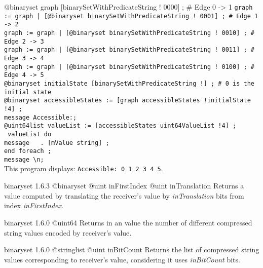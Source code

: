 \exempleUneLigne
{}
{@binaryset graph [binarySetWithPredicateString ! 0000\textquotedbl] ; \# Edge 0 -> 1}
\texttt{graph := graph | [@binaryset binarySetWithPredicateString ! 0001\textquotedbl] ; \# Edge 1 -> 2}\\
\texttt{graph := graph | [@binaryset binarySetWithPredicateString ! 0010\textquotedbl] ; \# Edge 2 -> 3}\\
\texttt{graph := graph | [@binaryset binarySetWithPredicateString ! 0011\textquotedbl] ; \# Edge 3 -> 4}\\
\texttt{graph := graph | [@binaryset binarySetWithPredicateString ! 0100\textquotedbl] ; \# Edge 4 -> 5}\\
\texttt{@binaryset initialState [binarySetWithPredicateString !\textquotedbl] ; \# 0 is the initial state}\\
\texttt{@binaryset accessibleStates := [graph accessibleStates !initialState !4] ;}\\
\texttt{message \textquotedbl Accessible:\textquotedbl ;}\\
\texttt{@uint64list valueList := [accessibleStates uint64ValueList !4] ;}\\
\texttt{ valueList do}\\
\texttt{message \textquotedbl~\textquotedbl~. [mValue string] ;}\\
\texttt{end foreach ;}\\
\texttt{message \textquotedbl\textbackslash n\textquotedbl ;}\\


This program displays: \texttt{Accessible: 0 1 2 3 4 5}.




{binaryset}
{1.6.3}
{@binaryset}
{@uint inFirstIndex}
{@uint inTranslation}
{Returns a  value computed by translating the receiver's value by \emph{inTranslation} bits from index \emph{inFirstIndex}.}
{}



{binaryset}
{1.6.0}
{@uint64}
{Returns in an  value the number of different compressed string values encoded by receiver's value.}
{}




{binaryset}
{1.6.0}
{@stringlist}
{@uint inBitCount}
{Returns the list of compressed string values corresponding to receiver's value, considering it uses \emph{inBitCount} bits.}
{}










